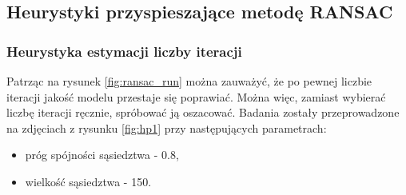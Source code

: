 \documentclass{article}
\begin{document}
	\subsection{Heurystyki przyspieszające metodę RANSAC}
	\subsubsection{Heurystyka estymacji liczby iteracji}
	Patrząc na rysunek \ref{fig:ransac_run} można zauważyć, że po pewnej liczbie iteracji jakość modelu przestaje się poprawiać. Można więc, zamiast wybierać liczbę iteracji ręcznie, spróbować ją oszacować.
	Badania zostały przeprowadzone na zdjęciach z rysunku \ref{fig:hp1} przy następujących parametrach:
	\begin{itemize}
		\item próg spójności sąsiedztwa - 0.8,
		\item wielkość sąsiedztwa - 150.
	\end{itemize}
	
\end{document}
